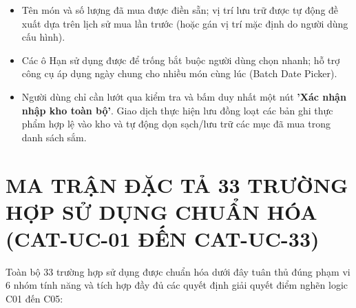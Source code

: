 \documentclass[10pt,a4paper]{article}
\begin{document}
\begin{enumerate}[itemsep=1pt]
\begin{itemize}[itemsep=1pt]
        \item Tên món và số lượng đã mua được điền sẵn; vị trí lưu trữ được tự động đề xuất dựa trên lịch sử mua lần trước (hoặc gán vị trí mặc định do người dùng cấu hình).
        \item Các ô Hạn sử dụng được để trống bắt buộc người dùng chọn nhanh; hỗ trợ công cụ áp dụng ngày chung cho nhiều món cùng lúc (Batch Date Picker).
        \item Người dùng chỉ cần lướt qua kiểm tra và bấm duy nhất một nút \textbf{'Xác nhận nhập kho toàn bộ'}. Giao dịch thực hiện lưu đồng loạt các bản ghi thực phẩm hợp lệ vào kho và tự động dọn sạch/lưu trữ các mục đã mua trong danh sách sắm.
    \end{itemize}
\end{enumerate}

\newpage
\section{MA TRẬN ĐẶC TẢ 33 TRƯỜNG HỢP SỬ DỤNG CHUẨN HÓA (CAT-UC-01 ĐẾN CAT-UC-33)}

Toàn bộ 33 trường hợp sử dụng được chuẩn hóa dưới đây tuân thủ đúng phạm vi 6 nhóm tính năng và tích hợp đầy đủ các quyết định giải quyết điểm nghẽn logic C01 đến C05:
\end{document}
